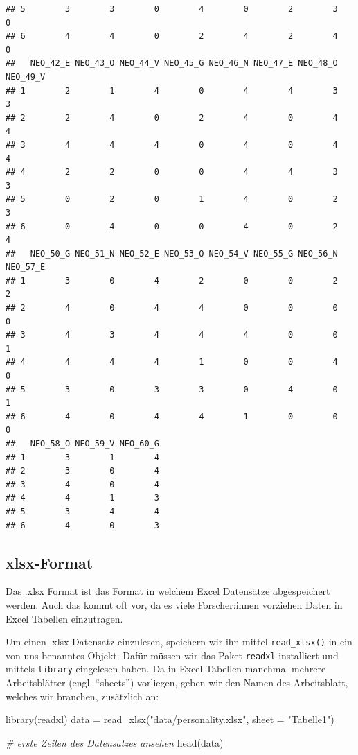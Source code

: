 \documentclass[
]{book}
\newenvironment{Shaded}{\begin{snugshade}}{\end{snugshade}}
\newcommand{\AttributeTok}[1]{\textcolor[rgb]{0.77,0.63,0.00}{#1}}
\newcommand{\CommentTok}[1]{\textcolor[rgb]{0.56,0.35,0.01}{\textit{#1}}}
\newcommand{\FunctionTok}[1]{\textcolor[rgb]{0.00,0.00,0.00}{#1}}
\newcommand{\NormalTok}[1]{#1}
\newcommand{\OtherTok}[1]{\textcolor[rgb]{0.56,0.35,0.01}{#1}}
\newcommand{\StringTok}[1]{\textcolor[rgb]{0.31,0.60,0.02}{#1}}
\begin{document}
\begin{verbatim}
## 5        3        3        0        4        0        2        3        0
## 6        4        4        0        2        4        2        4        0
##   NEO_42_E NEO_43_O NEO_44_V NEO_45_G NEO_46_N NEO_47_E NEO_48_O NEO_49_V
## 1        2        1        4        0        4        4        3        3
## 2        2        4        0        2        4        0        4        4
## 3        4        4        4        0        4        0        4        4
## 4        2        2        0        0        4        4        3        3
## 5        0        2        0        1        4        0        2        3
## 6        0        4        0        0        4        0        2        4
##   NEO_50_G NEO_51_N NEO_52_E NEO_53_O NEO_54_V NEO_55_G NEO_56_N NEO_57_E
## 1        3        0        4        2        0        0        2        2
## 2        4        0        4        4        0        0        0        0
## 3        4        3        4        4        4        0        0        1
## 4        4        4        4        1        0        0        4        0
## 5        3        0        3        3        0        4        0        1
## 6        4        0        4        4        1        0        0        0
##   NEO_58_O NEO_59_V NEO_60_G
## 1        3        1        4
## 2        3        0        4
## 3        4        0        4
## 4        4        1        3
## 5        3        4        4
## 6        4        0        3
\end{verbatim}

\hypertarget{xlsx-format}{%
\subsection{xlsx-Format}\label{xlsx-format}}

Das .xlsx Format ist das Format in welchem Excel Datensätze abgespeichert werden. Auch das kommt oft vor, da es viele Forscher:innen vorziehen Daten in Excel Tabellen einzutragen.

Um einen .xlsx Datensatz einzulesen, speichern wir ihn mittel \texttt{read\_xlsx()} in ein von uns benanntes Objekt. Dafür müssen wir das Paket \texttt{readxl} installiert und mittels \texttt{library} eingelesen haben. Da in Excel Tabellen manchmal mehrere Arbeitsblätter (engl. ``sheets'') vorliegen, geben wir den Namen des Arbeitsblatt, welches wir brauchen, zusätzlich an:

\begin{Shaded}
\begin{Highlighting}[]
\FunctionTok{library}\NormalTok{(readxl)}
\NormalTok{data }\OtherTok{=} \FunctionTok{read\_xlsx}\NormalTok{(}\StringTok{"data/personality.xlsx"}\NormalTok{, }\AttributeTok{sheet =} \StringTok{"Tabelle1"}\NormalTok{)}

\CommentTok{\# erste Zeilen des Datensatzes ansehen}
\FunctionTok{head}\NormalTok{(data)}
\end{Highlighting}
\end{Shaded}
\end{document}

